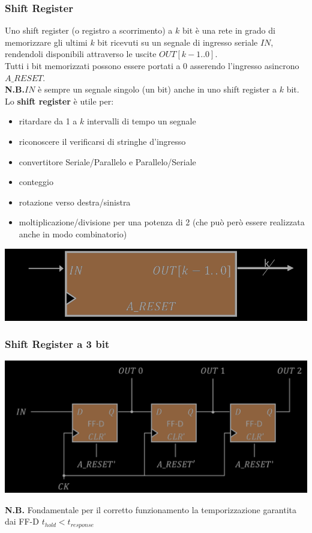 \documentclass{article}
\begin{document}
\subsubsection{Shift Register}
Uno shift register (o registro a scorrimento) a $k$ bit è una rete in grado di memorizzare gli ultimi $k$ bit ricevuti su un segnale di ingresso seriale $IN$, rendendoli disponibili attraverso le uscite $OUT[k-1..0]$.\\
Tutti i bit memorizzati possono essere portati a 0 asserendo l'ingresso asincrono $A\_RESET$.\\
\textbf{N.B.}$IN$ è sempre un segnale singolo (un bit) anche in uno shift register a $k$ bit.
\vspace{0.2cm}\\
Lo \textbf{\color{blue} shift register} è utile per:
\begin{itemize}
    \item ritardare da 1 a $k$ intervalli di tempo un segnale
    \item riconoscere il verificarsi di stringhe d’ingresso
    \item convertitore Seriale/Parallelo e Parallelo/Seriale
    \item conteggio
    \item rotazione verso destra/sinistra
    \item moltiplicazione/divisione per una potenza di 2 (che può però essere realizzata anche in modo combinatorio)
\end{itemize}
\begin{center}
    \includegraphics[scale=0.4]{shift register.png}
\end{center}
\subsubsection*{Shift Register a 3 bit}
\begin{center}
    \includegraphics[scale=0.4]{shift register 3 bit.png}
\end{center}
\textbf{N.B.} Fondamentale per il corretto funzionamento la temporizzazione garantita dai FF-D $t_{hold} < t_{response}$
\end{document}
